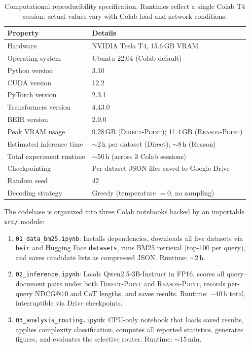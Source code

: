 \documentclass[12pt]{article}
\makeatletter
\newcommand{\ndcg}{NDCG@10}
\newcommand{\direct}{\textsc{Direct-Point}}
\newcommand{\reason}{\textsc{Reason-Point}}
\makeatother
\begin{document}
\begin{table}[htbp]
\caption{Computational reproducibility specification.  Runtimes reflect a single
         Colab T4 session; actual values vary with Colab load and network
         conditions.}
\label{tab:repro_details}
\centering
\small
\renewcommand{\arraystretch}{1.3}
\begin{tabular}{@{}ll@{}}
\toprule
\textbf{Property}           & \textbf{Details} \\
\midrule
Hardware                    & NVIDIA Tesla T4, 15.6\,GB VRAM \\
Operating system            & Ubuntu 22.04 (Colab default) \\
Python version              & 3.10 \\
CUDA version                & 12.2 \\
PyTorch version             & 2.3.1 \\
Transformers version        & 4.43.0 \\
BEIR version                & 2.0.0 \\
Peak VRAM usage             & 9.28\,GB (\direct{}); 11.4\,GB (\reason{}) \\
Estimated inference time    & $\sim$2\,h per dataset (Direct); $\sim$8\,h (Reason) \\
Total experiment runtime    & $\sim$50\,h (across 3 Colab sessions) \\
Checkpointing               & Per-dataset JSON files saved to Google Drive \\
Random seed                 & 42 \\
Decoding strategy           & Greedy (temperature $= 0$, no sampling) \\
\bottomrule
\end{tabular}
\end{table}

The codebase is organized into three Colab notebooks backed by an importable
\texttt{src/} module:

\begin{enumerate}[leftmargin=2em]
  \item \texttt{01\_data\_bm25.ipynb}: Installs dependencies, downloads all five
        datasets via \texttt{beir} and Hugging Face \texttt{datasets}, runs BM25
        retrieval (top-100 per query), and saves candidate lists as compressed
        JSON.  Runtime: $\sim$2\,h.

  \item \texttt{02\_inference.ipynb}: Loads Qwen2.5-3B-Instruct in FP16, scores
        all query--document pairs under both \direct{} and \reason{}, records
        per-query \ndcg{} and CoT lengths, and saves results.  Runtime:
        $\sim$40\,h total, interruptible via Drive checkpoints.

  \item \texttt{03\_analysis\_routing.ipynb}: CPU-only notebook that loads saved
        results, applies complexity classification, computes all reported
        statistics, generates figures, and evaluates the selective router.
        Runtime: $\sim$15\,min.
\end{enumerate}
\end{document}
